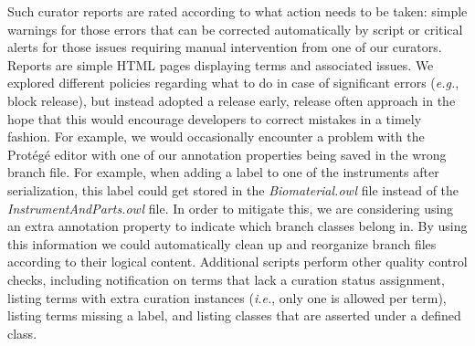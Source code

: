 \documentclass{elsart}       %
\begin{document}


Such curator reports are rated according to what action needs to be taken: simple warnings for those errors that can be corrected automatically by script or critical alerts for those issues requiring manual intervention from one of our curators. Reports are simple HTML pages displaying terms and associated issues.
We explored different policies regarding what to do in case of significant errors (\emph{e.g.}, block release), but instead adopted a release early, release often approach in the hope that this would encourage developers to correct mistakes in a timely fashion.
For example, we would occasionally encounter a problem with the Prot\'eg\'e\cite{protege} editor with one of our annotation properties being saved in the wrong branch file. For example, when adding a label to one of the instruments after serialization, this label could get stored in the \emph{Biomaterial.owl} file instead of the \emph{InstrumentAndParts.owl} file. 
In order to mitigate this, we are considering using an extra annotation property to indicate which branch classes belong in.
By using this information we could automatically clean up and reorganize branch files according to their logical content.
Additional scripts perform other quality control checks, including notification on terms that lack a curation status assignment, listing terms with extra curation instances (\emph{i.e.}, only one is allowed per term), listing terms missing a label, and listing classes that are asserted under a defined class.

\end{document}
